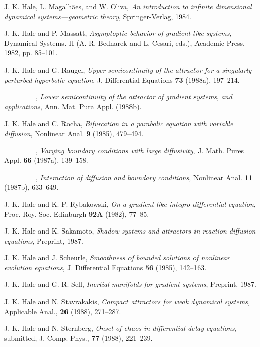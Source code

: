 \documentclass{surv-l}
\theoremstyle{plain}
\theoremstyle{definition}
\numberwithin{equation}{section}
\numberwithin{figure}{chapter}
\begin{document}
\begin{thebibliography}{}
J. K. Hale, L. Magalh\~{a}es, and W. Oliva, \emph{An introduction to infinite dimensional dynamical systems---geometric theory}, Springer-Verlag, 1984.

J. K. Hale and P. Massatt, \emph{Asymptoptic behavior of gradient-like systems}, Dynamical Systems. II (A. R. Bednarek and L. Cesari, eds.), Academic Press, 1982, pp. 85--101.

J. K. Hale and G. Raugel, \emph{Upper semicontinuity of the attractor for a singularly perturbed hyperbolic equation}, J. Differential Equations \textbf{73} (1988a), 197--214.

 \_\_\_\_\_\_, \emph{Lower semicontinuity of the attractor of gradient systems}, \emph{and applications}, Ann. Mat. Pura Appl. (1988b).

J. K. Hale and C. Rocha, \emph{Bifurcation in a parabolic equation with variable diffusion}, Nonlinear Anal. \textbf{9} (1985), 479--494.

 \_\_\_\_\_\_, \emph{Varying boundary conditions with large diffusivity}, J. Math. Pures Appl. \textbf{66} (1987a), 139--158.

 \_\_\_\_\_\_, \emph{Interaction of diffusion and boundary conditions}, Nonlinear Anal.
\textbf{11} (1987b), 633--649.

J. K. Hale and K. P. Rybakowski, \emph{On a gradient-like integro-differential equation}, Proc. Roy. Soc. Edinburgh \textbf{92A} (1982), 77--85.

J. K. Hale and K. Sakamoto, \emph{Shadow systems and attractors in reaction-diffusion equations}, Preprint, 1987.

J. K. Hale and J. Scheurle, \emph{Smoothness of bounded solutions of nonlinear evolution equations}, J. Differential Equations \textbf{56} (1985), 142--163.

J. K. Hale and G. R. Sell, \emph{Inertial manifolds for gradient systems}, Preprint, 1987.

J. K. Hale and N. Stavrakakis, \emph{Compact attractors for weak dynamical systems,}
Applicable Anal., \textbf{26} (1988), 271--287.

J. K. Hale and N. Sternberg, \emph{Onset of chaos in differential delay equations,}
submitted, J. Comp. Phys., \textbf{77} (1988), 221--239.


\end{thebibliography}
\end{document}
